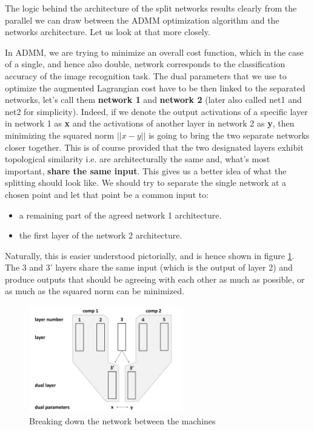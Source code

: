 \documentclass[a4paper, 12pt]{article}
\numberwithin{equation}{section}
\begin{document}
	The logic behind the architecture of the split networks results clearly from the parallel we can draw between the ADMM optimization algorithm and the networks architecture. Let us look at that more closely.
	
	In ADMM, we are trying to minimize an overall cost function, which in the case of a single, and hence also double, network corresponds to the classification accuracy of the image recognition task. The dual parameters that we use to optimize the augmented Lagrangian cost have to be then linked to the separated networks, let's call them \textbf{network 1} and \textbf{network 2} (later also called net1 and net2 for simplicity). Indeed, if we denote the output activations of a specific layer in network 1 as \textbf{x} and the activations of another layer in network 2 as \textbf{y}, then minimizing the squared norm $||x-y||$ is going to bring the two separate networks closer together. This is of course provided that the two designated layers exhibit topological similarity i.e. are architecturally the same and, what's most important, \textbf{share the same input}. This gives us a better idea of what the splitting should look like. We should try to separate the single network at a chosen point and let that point be a common input to:
	\begin{itemize}
		\item a remaining part of the agreed network 1 architecture.
		\item the first layer of the network 2 architecture.
	\end{itemize}
	
	Naturally, this is easier understood pictorially, and is hence shown in figure \ref{fig:dual-training}. The 3 and 3' layers share the same input (which is the output of layer 2) and produce outputs that should be agreeing with each other as much as possible, or as much as the squared norm can be minimized.
	
	\begin{figure}[!h]
		\centering
		\includegraphics[page=1,width=0.60\textwidth]{dual-training.pdf}
		\caption{\label{fig:dual-training}{Breaking down the network between the machines}}
	\end{figure}
	
\end{document}
